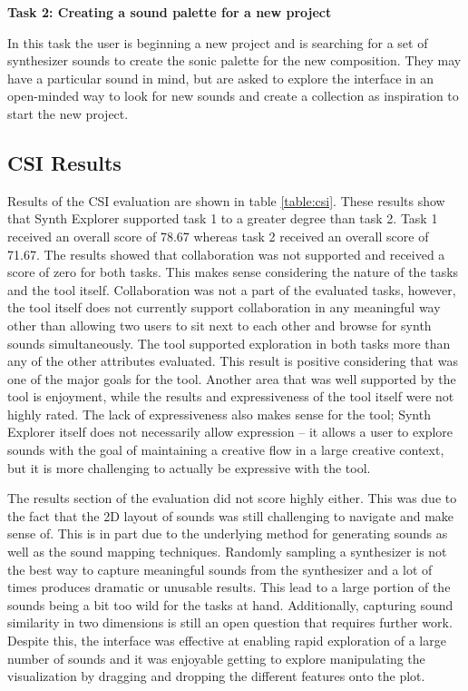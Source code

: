 \textbf{Task 2: Creating a sound palette for a new project}

In this task the user is beginning a new project and is searching for a set of synthesizer sounds to create the sonic palette for the new composition. They may have a particular sound in mind, but are asked to explore the interface in an open-minded way to look for new sounds and create a collection as inspiration to start the new project.

\subsection{CSI Results}
Results of the CSI evaluation are shown in table \ref{table:csi}. These results show that Synth Explorer supported task 1 to a greater degree than task 2. Task 1 received an overall score of 78.67 whereas task 2 received an overall score of 71.67. The results showed that collaboration was not supported and received a score of zero for both tasks. This makes sense considering the nature of the tasks and the tool itself. Collaboration was not a part of the evaluated tasks, however, the tool itself does not currently support collaboration in any meaningful way other than allowing two users to sit next to each other and browse for synth sounds simultaneously. The tool supported exploration in both tasks more than any of the other attributes evaluated. This result is positive considering that was one of the major goals for the tool. Another area that was well supported by the tool is enjoyment, while the results and expressiveness of the tool itself were not highly rated. The lack of expressiveness also makes sense for the tool; Synth Explorer itself does not necessarily allow expression -- it allows a user to explore sounds with the goal of maintaining a creative flow in a large creative context, but it is more challenging to actually be expressive with the tool.

The results section of the evaluation did not score highly either. This was due to the fact that the 2D layout of sounds was still challenging to navigate and make sense of. This is in part due to the underlying method for generating sounds as well as the sound mapping techniques. Randomly sampling a synthesizer is not the best way to capture meaningful sounds from the synthesizer and a lot of times produces dramatic or unusable results. This lead to a large portion of the sounds being a bit too wild for the tasks at hand. Additionally, capturing sound similarity in two dimensions is still an open question that requires further work. Despite this, the interface was effective at enabling rapid exploration of a large number of sounds and it was enjoyable getting to explore manipulating the visualization by dragging and dropping the different features onto the plot.

